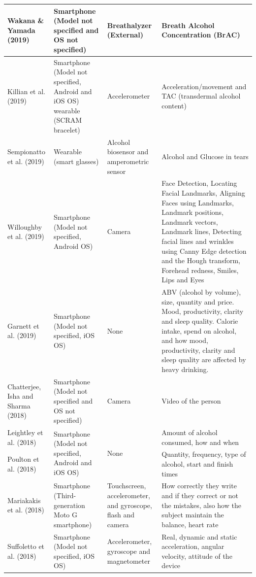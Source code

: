 \begin{longtable}[h!]{||p{} | p{} | p{}| p{}||}
Wakana \& Yamada (2019) \cite{Wakana2019} & Smartphone (Model not specified and OS not specified) & Breathalyzer (External) & Breath Alcohol Concentration (BrAC) \\ \hline
Killian et al. (2019) \cite{Killian201935} & Smartphone (Model not specified, Android and iOS OS) wearable (SCRAM bracelet) & Accelerometer & Acceleration/movement and TAC (transdermal alcohol content) \\ \hline
Sempionatto et al. (2019) \cite{Sempionatto2019161} & Wearable (smart glasses) & Alcohol biosensor and amperometric sensor & Alcohol and Glucose in tears \\ \hline
Willoughby et al. (2019) \cite{Willoughby2019496} & Smartphone (Model not specified, Android OS) & Camera & Face Detection, Locating Facial Landmarks, Aligning Faces using Landmarks, Landmark positions, Landmark vectors, Landmark lines, Detecting facial lines and wrinkles using Canny Edge detection and the Hough transform, Forehead redness, Smiles, Lips and Eyes \\ \hline
Garnett et al. (2019) \cite{Garnett2019296} & Smartphone (Model not specified, iOS OS) & None & ABV (alcohol by volume), size, quantity and price. Mood, productivity, clarity and sleep quality. Calorie intake, spend on alcohol, and how mood, productivity, clarity and sleep quality are affected by heavy drinking. \\ \hline
Chatterjee, Isha and Sharma (2018) \cite{Chatterjee2018} & Smartphone (Model not specified and OS not specified) & Camera & Video of the person \\ \hline
Leightley et al. (2018) \cite{Leightley2018} & \multirow{2}{=}{Smartphone (Model not specified, Android and iOS OS)} & \multirow{2}{=}{None} & Amount of alcohol consumed, how and when \\ \cline{1-1} \cline{4-4}
Poulton et al. (2018) \cite{Poulton201835} & &  & Quantity, frequency, type of alcohol, start and finish times \\ \hline
Mariakakis et al. (2018) \cite{Mariakakis2018} & Smartphone (Third-generation Moto G smartphone) & Touchscreen, accelerometer, and gyroscope, flash and camera & How correctly they write and if they correct or not the mistakes, also how the subject maintain the balance, heart rate \\ \hline
Suffoletto et al. (2018) \cite{Suffoletto2018116} & Smartphone (Model not specified, iOS OS) & Accelerometer, gyroscope and magnetometer & Real, dynamic and static acceleration, angular velocity, attitude of the device \\ \hline

\end{longtable}
